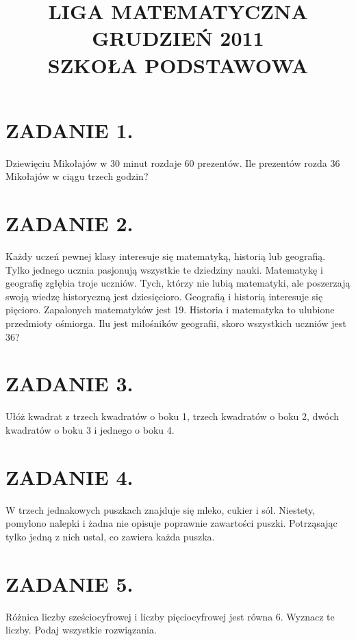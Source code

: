 \documentclass[10pt]{article}
\title{LIGA MATEMATYCZNA \\
 GRUDZIEŃ 2011 \\
 SZKOŁA PODSTAWOWA }
\author{}
\date{}
\begin{document}
\maketitle
\section*{ZADANIE 1.}
Dziewięciu Mikołajów w 30 minut rozdaje 60 prezentów. Ile prezentów rozda 36 Mikołajów w ciągu trzech godzin?

\section*{ZADANIE 2.}
Każdy uczeń pewnej klasy interesuje się matematyką, historią lub geografią. Tylko jednego ucznia pasjonują wszystkie te dziedziny nauki. Matematykę i geografię zgłębia troje uczniów. Tych, którzy nie lubią matematyki, ale poszerzają swoją wiedzę historyczną jest dziesięcioro. Geografią i historią interesuje się pięcioro. Zapalonych matematyków jest 19. Historia i matematyka to ulubione przedmioty ośmiorga. Ilu jest miłośników geografii, skoro wszystkich uczniów jest 36?

\section*{ZADANIE 3.}
Ułóż kwadrat z trzech kwadratów o boku 1, trzech kwadratów o boku 2, dwóch kwadratów o boku 3 i jednego o boku 4.

\section*{ZADANIE 4.}
W trzech jednakowych puszkach znajduje się mleko, cukier i sól. Niestety, pomylono nalepki i żadna nie opisuje poprawnie zawartości puszki. Potrząsając tylko jedną z nich ustal, co zawiera każda puszka.

\section*{ZADANIE 5.}
Różnica liczby sześciocyfrowej i liczby pięciocyfrowej jest równa 6. Wyznacz te liczby. Podaj wszystkie rozwiązania.
\end{document}
